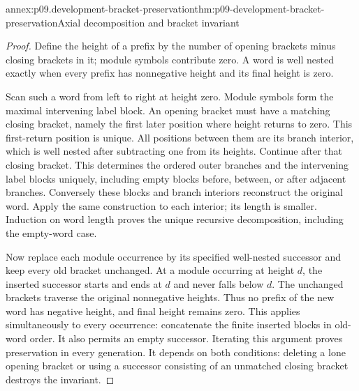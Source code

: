 \begin{annexitem}{annex:p09.development-bracket-preservation}{thm:p09-development-bracket-preservation}{Axial decomposition and bracket invariant}
\begin{proof}
Define the height of a prefix by the number of opening brackets minus
closing brackets in it; module symbols contribute zero. A word is well
nested exactly when every prefix has nonnegative height and its final
height is zero.

Scan such a word from left to right at height zero. Module symbols form
the maximal intervening label block. An opening bracket must have a
matching closing bracket, namely the first later position where height
returns to zero. This first-return position is unique. All positions
between them are its branch interior, which is well nested after
subtracting one from its heights. Continue after that closing bracket.
This determines the ordered outer branches and the intervening label
blocks uniquely, including empty blocks before, between, or after
adjacent branches. Conversely these blocks and branch interiors reconstruct
the original word. Apply the same construction to each interior;
its length is smaller. Induction on word length proves the unique
recursive decomposition, including the empty-word case.

Now replace each module occurrence by its specified well-nested successor
and keep every old bracket unchanged. At a module occurring at height \(d\),
the inserted successor starts and ends at \(d\) and never falls below \(d\).
The unchanged brackets traverse the original nonnegative heights.
Thus no prefix of the new word has negative height, and final height
remains zero. This applies simultaneously to every occurrence: concatenate
the finite inserted blocks in old-word order. It also permits an empty
successor. Iterating this argument proves preservation in every generation.
It depends on both conditions: deleting a lone opening bracket or using
a successor consisting of an unmatched closing bracket destroys the invariant.
\end{proof}
\end{annexitem}

